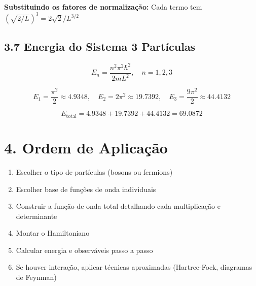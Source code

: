\documentclass[12pt,a4paper]{article}
\begin{document}
\textbf{Substituindo os fatores de normalização:} Cada termo tem \((\sqrt{2/L})^3 = 2 \sqrt{2}/L^{3/2}\)

\subsection*{3.7 Energia do Sistema 3 Partículas}

\[
E_n = \frac{n^2 \pi^2 \hbar^2}{2 m L^2}, \quad n=1,2,3
\]

\[
E_1 = \frac{\pi^2}{2} \approx 4.9348, \quad
E_2 = 2 \pi^2 \approx 19.7392, \quad
E_3 = \frac{9 \pi^2}{2} \approx 44.4132
\]

\[
E_{\text{total}} = 4.9348 + 19.7392 + 44.4132 = 69.0872
\]

\section*{4. Ordem de Aplicação}

\begin{enumerate}
    \item Escolher o tipo de partículas (bosons ou fermions)
    \item Escolher base de funções de onda individuais
    \item Construir a função de onda total detalhando cada multiplicação e determinante
    \item Montar o Hamiltoniano
    \item Calcular energia e observáveis passo a passo
    \item Se houver interação, aplicar técnicas aproximadas (Hartree-Fock, diagramas de Feynman)
\end{enumerate}
\end{document}
